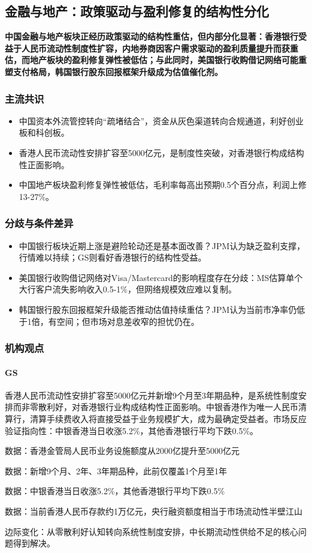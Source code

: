 \documentclass[11pt]{ctexart}
\begin{document}
\subsection{金融与地产：政策驱动与盈利修复的结构性分化}
\textbf{中国金融与地产板块正经历政策驱动的结构性重估，但内部分化显著：香港银行受益于人民币流动性制度性扩容，内地券商因客户需求驱动的盈利质量提升而获重估，而地产板块的盈利修复弹性被低估；与此同时，美国银行收购借记网络可能重塑支付格局，韩国银行股东回报框架升级成为估值催化剂。}
\subsubsection*{主流共识}
\begin{itemize}
  \item 中国资本外流管控转向“疏堵结合”，资金从灰色渠道转向合规通道，利好创业板和科创板。
  \item 香港人民币流动性安排扩容至5000亿元，是制度性突破，对香港银行构成结构性正面影响。
  \item 中国地产板块盈利修复弹性被低估，毛利率每高出预期0.5个百分点，利润上修13-27\%。
\end{itemize}
\subsubsection*{分歧与条件差异}
\begin{itemize}
  \item 中国银行板块近期上涨是避险轮动还是基本面改善？JPM认为缺乏盈利支撑，行情难以持续；GS则看好香港银行的结构性受益。
  \item 美国银行收购借记网络对Visa/Mastercard的影响程度存在分歧：MS估算单个大行客户流失影响收入0.5-1\%，但网络规模效应难以复制。
  \item 韩国银行股东回报框架升级能否推动估值持续重估？JPM认为当前市净率仍低于1倍，有空间；但市场对息差收窄的担忧仍在。
\end{itemize}
\subsubsection*{机构观点}
\paragraph{GS} 香港人民币流动性安排扩容至5000亿元并新增9个月至3年期品种，是系统性制度安排而非零散利好，对香港银行业构成结构性正面影响。中银香港作为唯一人民币清算行，清算手续费收入将直接受益于业务规模扩大，成为最确定受益者。市场反应验证指向性：中银香港当日收涨5.2\%，其他香港银行平均下跌0.5\%。
{\small\color{refgray}数据：香港金管局人民币业务设施额度从2000亿提升至5000亿元\par}
{\small\color{refgray}数据：新增9个月、2年、3年期品种，此前仅覆盖1个月至1年\par}
{\small\color{refgray}数据：中银香港当日收涨5.2\%，其他香港银行平均下跌0.5\%\par}
{\small\color{refgray}数据：当前香港人民币存款约1万亿元，央行融资额度相当于市场流动性半壁江山\par}
{\small\color{refgray}边际变化：从零散利好认知转向系统性制度安排，中长期流动性供给不足的核心问题得到解决。\par}
\end{document}
